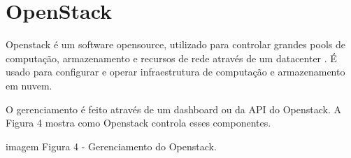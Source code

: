 \chapter[OpenStack]{OpenStack}\label{cap1}

Openstack é um software opensource, utilizado para  controlar grandes pools de computação, armazenamento e recursos de rede através de um datacenter \cite{ref3}. É usado para configurar e operar infraestrutura de computação e armazenamento em nuvem.

O gerenciamento é feito através de um dashboard ou da API do Openstack. A Figura 4 mostra como Openstack controla esses componentes.

imagem Figura 4 - Gerenciamento do Openstack.
